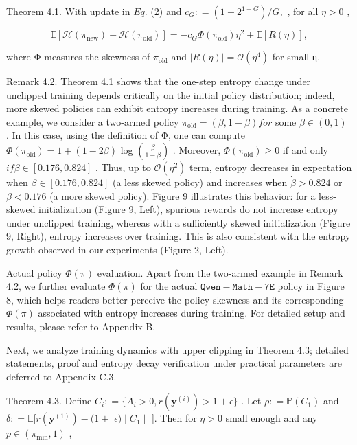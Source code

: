 \documentclass[
  10
]{article}
\begin{document}
Theorem 4.1. With update in \(E q .\) (2) and
\(c _ { G } : = ( 1 - 2 ^ { 1 - G } ) / G ,\) , for all \(\eta > 0\) ,

\[
\mathbb {E} [ \mathcal {H} (\pi_ {\mathrm{new}}) - \mathcal {H} (\pi_ {\mathrm{old}}) ] = - c _ {G} \Phi (\pi_ {\mathrm{old}}) \eta^ {2} + \mathbb {E} [ R (\eta) ],
\]

where Φ measures the skewness of \(\pi _ { \mathrm { o l d } }\) and
\(| R ( \eta ) | = \mathcal { O } ( \eta ^ { 4 } )\) for small η.

Remark 4.2. Theorem 4.1 shows that the one-step entropy change under
unclipped training depends critically on the initial policy
distribution; indeed, more skewed policies can exhibit entropy increases
during training. As a concrete example, we consider a two-armed policy
\(\pi _ { \mathrm { o l d } } = ( \beta , 1 - \beta ) f o r\) some
\(\beta \in ( 0 , 1 )\) . In this case, using the definition of Φ, one
can compute
\(\Phi ( \pi _ { \mathrm { o l d } } ) = 1 + ( 1 - 2 \beta )\) log
\(\displaystyle ( \frac { \beta } { 1 - \beta } )\) . Moreover,
\(\Phi ( \pi _ { \mathrm { o l d } } ) \ge 0\) if and only
\(i f \beta \in [ 0 . 1 7 6 , 0 . 8 2 4 ]\) . Thus, up to
\(\mathcal { O } ( \eta ^ { 2 } )\) term, entropy decreases in
expectation when \(\beta \in [ 0 . 1 7 6 , 0 . 8 2 4 ]\) (a less skewed
policy) and increases when \(\dot { \beta } > 0 . 8 2 4\) or
\(\beta < 0 . 1 7 6\) (a more skewed policy). Figure 9 illustrates this
behavior: for a less-skewed initialization (Figure 9, Left), spurious
rewards do not increase entropy under unclipped training, whereas with a
sufficiently skewed initialization (Figure 9, Right), entropy increases
over training. This is also consistent with the entropy growth observed
in our experiments (Figure 2, Left).

Actual policy \(\Phi ( \pi )\) evaluation. Apart from the two-armed
example in Remark 4.2, we further evaluate \(\Phi ( \pi )\) for the
actual \(\mathtt { Q w e n - M a t h - 7 E }\) policy in Figure 8, which
helps readers better perceive the policy skewness and its corresponding
\(\Phi ( \pi )\) associated with entropy increases during training. For
detailed setup and results, please refer to Appendix B.

Next, we analyze training dynamics with upper clipping in Theorem 4.3;
detailed statements, proof and entropy decay verification under
practical parameters are deferred to Appendix C.3.

Theorem 4.3. Define
\(C _ { i } : = \{ A _ { i } > 0 , r ( \mathbf { y } ^ { ( i ) } ) > 1 + \epsilon \}\)
. Let \(\rho : = \mathbb { P } ( C _ { 1 } )\) and
\(\delta : = \mathbb { E } [ r ( \mathbf { y } ^ { ( 1 ) } ) - ( 1 +\)
\(\epsilon ) \mid C _ { 1 } \mid\) {]}. Then for \(\eta > 0\) small
enough and any \(p \in ( \pi _ { \operatorname* { m i n } } , 1 )\) ,
\end{document}
